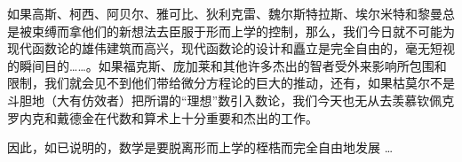 如果高斯、柯西、阿贝尔、雅可比、狄利克雷、魏尔斯特拉斯、埃尔米特和黎曼总是被束缚而拿他们的新想法去臣服于形而上学的控制，那么，我们今日就不可能为现代函数论的雄伟建筑而高兴，现代函数论的设计和矗立是完全自由的，毫无短视的瞬间目的……。如果福克斯、庞加莱和其他许多杰出的智者受外来影响所包围和限制，我们就会见不到他们带给微分方程论的巨大的推动，还有，如果枯莫尔不是斗胆地（大有仿效者）把所谓的“理想”数引入数论，我们今天也无从去羡慕钦佩克罗内克和戴德金在代数和算术上十分重要和杰出的工作。

因此，如已说明的，数学是要脱离形而上学的桎梏而完全自由地发展 \dots



